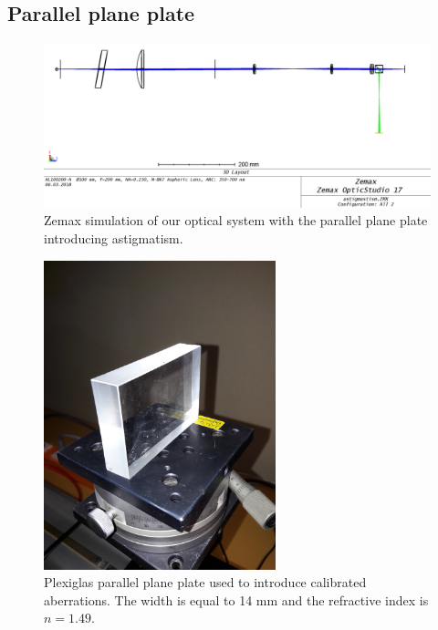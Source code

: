 \subsection{Parallel plane plate}
\label{subsec:ParPlanePlate}

\begin{figure}
\begin{center}
\includegraphics[width=\textwidth,angle=0]{Figures/parallelPlanePlateWithBS.png}
\decoRule
\caption{Zemax simulation of our optical system with the parallel plane plate introducing astigmatism.}
\label{fig:parallelPlanePlate}
\end{center}
\end{figure}



\begin{figure}
\begin{center}
\includegraphics[width=0.6\textwidth,angle=-90]{Figures/ParPlanePlate.jpg}
\decoRule
\caption{Plexiglas parallel plane plate used to introduce calibrated aberrations. The width is equal to 14 mm and the refractive index is $n = 1.49$.}
\label{fig:ParPlanePlate}
\end{center}
\end{figure}

